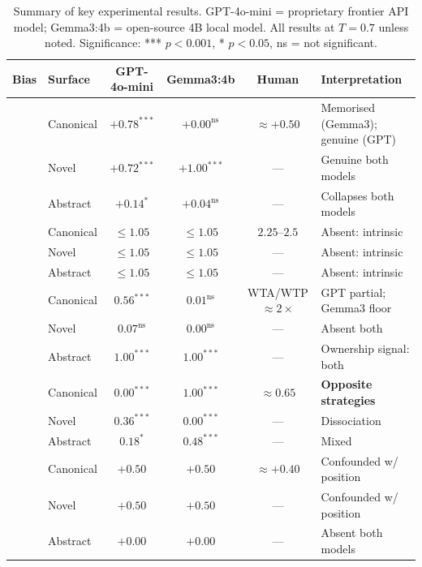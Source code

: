 \documentclass{article}
\begin{document}
\begin{table}[t]
\centering
\caption{Summary of key experimental results. GPT-4o-mini = proprietary
frontier API model; Gemma3:4b = open-source 4B local model. All results
at $T=0.7$ unless noted. Significance: *** $p<0.001$, * $p<0.05$,
ns = not significant.}
\label{tab:main}
\small
\begin{tabular}{llcccl}
\toprule
\textbf{Bias} & \textbf{Surface} &
\textbf{GPT-4o-mini} & \textbf{Gemma3:4b} &
\textbf{Human} & \textbf{Interpretation} \\
\midrule
{}
  & Canonical & $+0.78^{***}$ & $+0.00^{\text{ns}}$ & $\approx+0.50$ & Memorised (Gemma3); genuine (GPT) \\
  & Novel     & $+0.72^{***}$ & $+1.00^{***}$       & ---            & Genuine both models \\
  & Abstract  & $+0.14^{*}$   & $+0.04^{\text{ns}}$ & ---            & Collapses both models \\
\midrule
{}
  & Canonical & $\leq 1.05$ & $\leq 1.05$ & $2.25$--$2.5$ & Absent: intrinsic \\
  & Novel     & $\leq 1.05$ & $\leq 1.05$ & ---           & Absent: intrinsic \\
  & Abstract  & $\leq 1.05$ & $\leq 1.05$ & ---           & Absent: intrinsic \\
\midrule
{}
  & Canonical & $0.56^{***}$  & $0.01^{\text{ns}}$ & WTA/WTP $\approx 2\times$ & GPT partial; Gemma3 floor \\
  & Novel     & $0.07^{\text{ns}}$ & $0.00^{\text{ns}}$ & --- & Absent both \\
  & Abstract  & $1.00^{***}$  & $1.00^{***}$        & --- & Ownership signal: both \\
\midrule
{}
  & Canonical & $0.00^{***}$ & $1.00^{***}$ & $\approx 0.65$ & \textbf{Opposite strategies} \\
  & Novel     & $0.36^{***}$ & $0.00^{***}$ & ---            & Dissociation \\
  & Abstract  & $0.18^{*}$   & $0.48^{***}$ & ---            & Mixed \\
\midrule
{}
  & Canonical & $+0.50$ & $+0.50$ & $\approx+0.40$ & Confounded w/ position \\
  & Novel     & $+0.50$ & $+0.50$ & ---            & Confounded w/ position \\
  & Abstract  & $+0.00$ & $+0.00$ & ---            & Absent both models \\
\bottomrule
\end{tabular}
\end{table}
\end{document}
